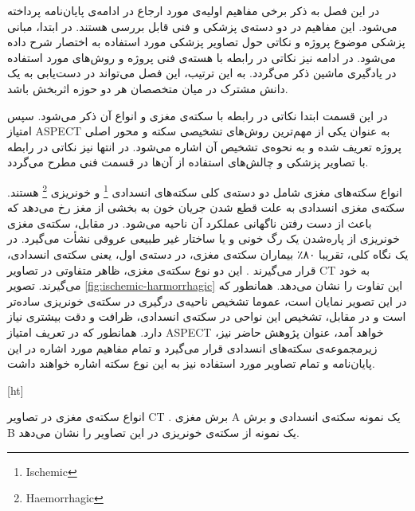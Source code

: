 

در این فصل به ذکر برخی مفاهیم اولیه‌ی مورد ارجاع در ادامه‌ی پایان‌نامه پرداخته می‌شود.
این مفاهیم در دو دسته‌ی پزشکی و فنی قابل بررسی هستند.
در ابتدا، مبانی پزشکی موضوع پروژه و نکاتی حول تصاویر پزشکی مورد استفاده به اختصار شرح داده می‌شود.
در ادامه نیز نکاتی در رابطه با هسته‌ی فنی پروژه و روش‌های مورد استفاده در یادگیری ماشین ذکر می‌گردد.
به این ترتیب، این فصل می‌تواند در دست‌یابی به یک دانش مشترک در میان متخصصان هر دو حوزه اثربخش باشد.


در این قسمت ابتدا نکاتی در رابطه با سکته‌ی مغزی و انواع آن ذکر می‌شود.
سپس امتیاز ASPECT به عنوان یکی از مهم‌ترین روش‌های تشخیصی سکته و محور اصلی پروژه تعریف شده و
به نحوه‌ی تشخیص آن اشاره می‌شود.
در انتها نیز نکاتی در رابطه با تصاویر پزشکی و چالش‌های استفاده از آن‌ها در قسمت فنی مطرح می‌گردد.


انواع سکته‌های مغزی شامل دو دسته‌ی کلی سکته‌های انسدادی
\footnote{Ischemic}
و خونریزی
\footnote{Haemorrhagic} 
هستند.
سکته‌ی مغزی انسدادی به علت قطع شدن جریان خون به بخشی از مغز رخ می‌دهد که باعث از دست رفتن ناگهانی عملکرد آن ناحیه می‌شود.
در مقابل، سکته‌ی مغزی خونریزی از پاره‌شدن یک رگ خونی و یا ساختار غیر طبیعی عروقی نشأت می‌گیرد.
در یک نگاه کلی، تقریبا ۸۰٪ بیماران سکته‌ی مغزی، در دسته‌ی اول، یعنی سکته‌ی انسدادی، قرار می‌گیرند \cite{donkor2018stroke}.
این دو نوع سکته‌ی مغزی، ظاهر متفاوتی در تصاویر CT به خود می‌گیرند.
تصویر 
\ref{fig:ischemic-harmorrhagic}
 این تفاوت را نشان می‌دهد.
همانطور که در این تصویر نمایان است، عموما تشخیص ناحیه‌ی درگیری
در سکته‌ی خونریزی ساده‌تر است و در مقابل، تشخیص این نواحی در سکته‌ی انسدادی، ظرافت و دقت بیشتری نیاز دارد.
همانطور که در تعریف امتیاز ASPECT خواهد آمد، عنوان پژوهش حاضر نیز، زیرمجموعه‌ی 
سکته‌های انسدادی قرار می‌گیرد و تمام مفاهیم مورد اشاره در این پایان‌نامه و تمام تصاویر مورد استفاده نیز به این نوع سکته اشاره خواهند داشت.


[ht]
\caption[انواع سکته‌ی مغزی]{انواع سکته‌ی مغزی در تصاویر CT \cite{le2018ischemic}. برش مغزی A یک نمونه سکته‌ی انسدادی و برش B یک نمونه از سکته‌ی خونریزی در این تصاویر را نشان می‌دهد.}


